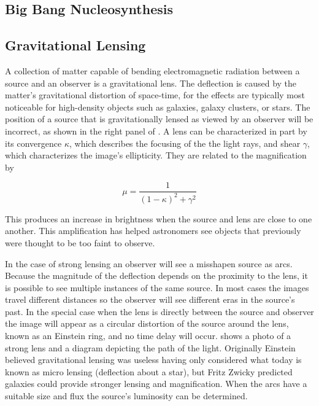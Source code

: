 \subsection{Big Bang Nucleosynthesis}



\subsection{Gravitational Lensing}
\label{subsec:gravitational_lensing}
A collection of matter capable of bending electromagnetic radiation between a source and an observer is a gravitational
lens.  The deflection is caused by the matter's gravitational distortion of space-time, for
the effects are typically most noticeable for high-density objects
such as galaxies, galaxy clusters, or stars.  The position of a source that is gravitationally lensed as viewed by an observer will be
incorrect, as shown in the right panel of .  A lens can be characterized in part by its convergence
$\kappa$, which describes the focusing of the the light rays, and shear $\gamma$, which characterizes the image's ellipticity.  They
are related to the magnification by

\begin{equation}
\mu = \frac{1}{(1-\kappa)^{2} + \gamma^{2}}
\end{equation}

\noindent This produces an increase in brightness when the source and lens are close to one another.  This amplification has helped
astronomers see objects that previously were thought to be too faint to observe.

In the case of strong lensing an observer will see a misshapen source as arcs.  Because the magnitude of the
deflection depends on the proximity to the lens, it is possible to see multiple instances of the same source.  In most cases the images
travel different distances so the observer will see different eras in the source's past.  In the special case
when the lens is directly between the source and observer the image will appear as a circular distortion of the source around the lens,
known as an Einstein ring, and no time delay will occur.  
shows a photo of a strong lens and a diagram depicting the path of the light.  Originally Einstein
believed gravitational lensing was useless having only considered what today is known as micro lensing (deflection
about a star), but Fritz Zwicky predicted galaxies could provide stronger lensing and
magnification.  When the arcs have a suitable size and flux the source's luminosity can be determined.


